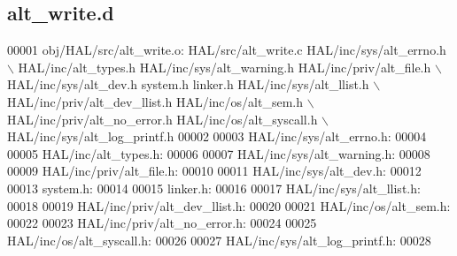 \subsection{alt\+\_\+write.\+d}
\label{alt__write_8d_source}

\begin{DoxyCode}
00001 obj/HAL/src/alt\_write.o: HAL/src/alt\_write.c HAL/inc/sys/alt_errno.h \(\backslash\)
 HAL/inc/alt\_types.h HAL/inc/sys/alt\_warning.h HAL/inc/priv/alt\_file.h \(\backslash\)
 HAL/inc/sys/alt_dev.h system.h linker.h HAL/inc/sys/alt_llist.h \(\backslash\)
 HAL/inc/priv/alt_dev_llist.h HAL/inc/os/alt\_sem.h \(\backslash\)
 HAL/inc/priv/alt_no_error.h HAL/inc/os/alt\_syscall.h \(\backslash\)
 HAL/inc/sys/alt\_log\_printf.h
00002 
00003 HAL/inc/sys/alt_errno.h:
00004 
00005 HAL/inc/alt\_types.h:
00006 
00007 HAL/inc/sys/alt\_warning.h:
00008 
00009 HAL/inc/priv/alt\_file.h:
00010 
00011 HAL/inc/sys/alt_dev.h:
00012 
00013 system.h:
00014 
00015 linker.h:
00016 
00017 HAL/inc/sys/alt_llist.h:
00018 
00019 HAL/inc/priv/alt_dev_llist.h:
00020 
00021 HAL/inc/os/alt\_sem.h:
00022 
00023 HAL/inc/priv/alt_no_error.h:
00024 
00025 HAL/inc/os/alt\_syscall.h:
00026 
00027 HAL/inc/sys/alt\_log\_printf.h:
00028 \end{DoxyCode}
